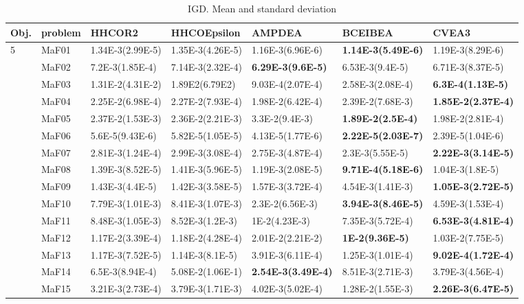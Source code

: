 \documentclass[]{article}
\begin{document}
\begin{landscape}
\begin{table}
\caption{IGD. Mean and standard deviation}
\label{table:mean.IGD}
\centering
\begin{footnotesize}
\begin{tabular}{|l|l|l|l|l|l|l|}
\hline
Obj. & problem  & HHCOR2 & HHCOEpsilon & AMPDEA & BCEIBEA & CVEA3 \\ \hline

\multirow{15}{*}{5} & MaF01 & 1.34E-3(2.99E-5) & 1.35E-3(4.26E-5) & \cellcolor{gray95} 1.16E-3(6.96E-6) & \cellcolor{gray95} {\bf 1.14E-3(5.49E-6)} & 1.19E-3(8.29E-6)\\
 & MaF02 & 7.2E-3(1.85E-4) & 7.14E-3(2.32E-4) & \cellcolor{gray95} {\bf 6.29E-3(9.6E-5)} & \cellcolor{gray95} 6.53E-3(9.4E-5) & 6.71E-3(8.37E-5)\\
 & MaF03 & 1.31E-2(4.31E-2) & 1.89E2(6.79E2) & \cellcolor{gray95} 9.03E-4(2.07E-4) & 2.58E-3(2.08E-4) & \cellcolor{gray95} {\bf 6.3E-4(1.13E-5)}\\
 & MaF04 & 2.25E-2(6.98E-4) & 2.27E-2(7.93E-4) & 1.98E-2(6.42E-4) & 2.39E-2(7.68E-3) & \cellcolor{gray95} {\bf 1.85E-2(2.37E-4)}\\
 & MaF05 & 2.37E-2(1.53E-3) & 2.36E-2(2.21E-3) & 3.3E-2(9.4E-3) & \cellcolor{gray95} {\bf 1.89E-2(2.5E-4)} & \cellcolor{gray95} 1.98E-2(2.81E-4)\\
 & MaF06 & 5.6E-5(9.43E-6) & 5.82E-5(1.05E-5) & 4.13E-5(1.77E-6) & \cellcolor{gray95} {\bf 2.22E-5(2.03E-7)} & \cellcolor{gray95} 2.39E-5(1.04E-6)\\
 & MaF07 & 2.81E-3(1.24E-4) & 2.99E-3(3.08E-4) & 2.75E-3(4.87E-4) & \cellcolor{gray95} 2.3E-3(5.55E-5) & \cellcolor{gray95} {\bf 2.22E-3(3.14E-5)}\\
 & MaF08 & 1.39E-3(8.52E-5) & 1.41E-3(5.96E-5) & 1.19E-3(2.08E-5) & \cellcolor{gray95} {\bf 9.71E-4(5.18E-6)} & \cellcolor{gray95} 1.04E-3(1.8E-5)\\
 & MaF09 & 1.43E-3(4.4E-5) & 1.42E-3(3.58E-5) & 1.57E-3(3.72E-4) & 4.54E-3(1.41E-3) & \cellcolor{gray95} {\bf 1.05E-3(2.72E-5)}\\
 & MaF10 & 7.79E-3(1.01E-3) & 8.41E-3(1.07E-3) & 2.3E-2(6.56E-3) & \cellcolor{gray95} {\bf 3.94E-3(8.46E-5)} & \cellcolor{gray95} 4.59E-3(1.53E-4)\\
 & MaF11 & 8.48E-3(1.05E-3) & 8.52E-3(1.2E-3) & 1E-2(4.23E-3) & \cellcolor{gray95} 7.35E-3(5.72E-4) & \cellcolor{gray95} {\bf 6.53E-3(4.81E-4)}\\
 & MaF12 & 1.17E-2(3.39E-4) & 1.18E-2(4.28E-4) & 2.01E-2(2.21E-2) & \cellcolor{gray95} {\bf 1E-2(9.36E-5)} & \cellcolor{gray95} 1.03E-2(7.75E-5)\\
 & MaF13 & 1.17E-3(7.52E-5) & 1.14E-3(8.1E-5) & 3.91E-3(6.11E-4) & 1.25E-3(1.01E-4) & \cellcolor{gray95} {\bf 9.02E-4(1.72E-4)}\\
 & MaF14 & 6.5E-3(8.94E-4) & 5.08E-2(1.06E-1) & \cellcolor{gray95} {\bf 2.54E-3(3.49E-4)} & 8.51E-3(2.71E-3) & \cellcolor{gray95} 3.79E-3(4.56E-4)\\
 & MaF15 & 3.21E-3(2.73E-4) & 3.79E-3(1.71E-3) & 4.02E-3(5.02E-4) & 1.28E-2(1.55E-3) & \cellcolor{gray95} {\bf 2.26E-3(6.47E-5)}\\
\hline


\end{tabular}
\end{footnotesize}
\end{table}
\end{landscape}
\end{document}
